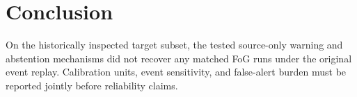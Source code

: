 \documentclass[sigconf,review,anonymous]{acmart}
\begin{document}
\section{Conclusion}
On the historically inspected target subset, the tested source-only warning and abstention mechanisms did not recover any matched FoG runs under the original event replay. Calibration units, event sensitivity, and false-alert burden must be reported jointly before reliability claims.


\end{document}
